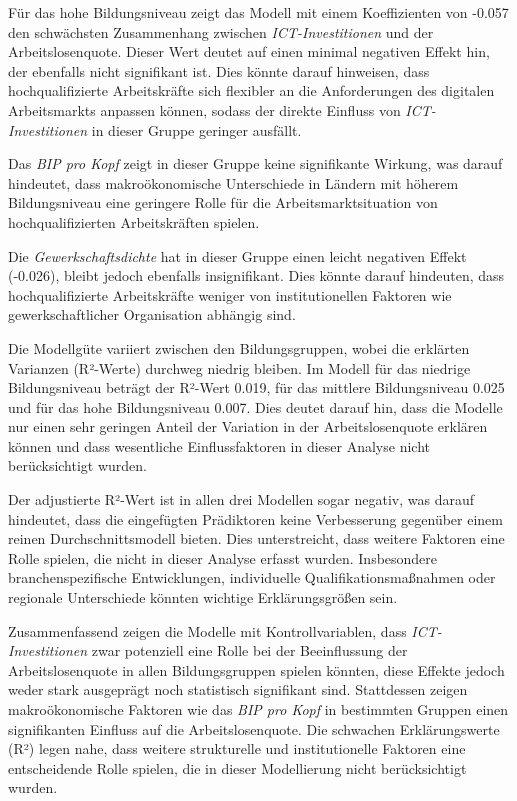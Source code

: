 Für das hohe Bildungsniveau zeigt das Modell mit einem Koeffizienten von -0.057 den 
schwächsten Zusammenhang zwischen \textit{\ac{ICT}-Investitionen} und der Arbeitslosenquote. 
Dieser Wert deutet auf einen minimal negativen Effekt hin, der ebenfalls nicht signifikant 
ist. Dies könnte darauf hinweisen, dass hochqualifizierte Arbeitskräfte sich flexibler an 
die Anforderungen des digitalen Arbeitsmarkts anpassen können, sodass der direkte Einfluss 
von \textit{\ac{ICT}-Investitionen} in dieser Gruppe geringer ausfällt.

Das \textit{\ac{BIP} pro Kopf} zeigt in dieser Gruppe keine signifikante Wirkung, was darauf 
hindeutet, dass makroökonomische Unterschiede in Ländern mit höherem Bildungsniveau eine 
geringere Rolle für die Arbeitsmarktsituation von hochqualifizierten Arbeitskräften spielen.

Die \textit{Gewerkschaftsdichte} hat in dieser Gruppe einen leicht negativen Effekt (-0.026), 
bleibt jedoch ebenfalls insignifikant. Dies könnte darauf hindeuten, dass hochqualifizierte 
Arbeitskräfte weniger von institutionellen Faktoren wie gewerkschaftlicher Organisation 
abhängig sind.

Die Modellgüte variiert zwischen den Bildungsgruppen, wobei die erklärten Varianzen (R²-Werte) 
durchweg niedrig bleiben. Im Modell für das niedrige Bildungsniveau beträgt der R²-Wert 0.019, 
für das mittlere Bildungsniveau 0.025 und für das hohe Bildungsniveau 0.007. Dies deutet darauf 
hin, dass die Modelle nur einen sehr geringen Anteil der Variation in der Arbeitslosenquote 
erklären können und dass wesentliche Einflussfaktoren in dieser Analyse nicht berücksichtigt 
wurden.

Der adjustierte R²-Wert ist in allen drei Modellen sogar negativ, was darauf hindeutet, dass 
die eingefügten Prädiktoren keine Verbesserung gegenüber einem reinen Durchschnittsmodell bieten. 
Dies unterstreicht, dass weitere Faktoren eine Rolle spielen, die nicht in dieser Analyse 
erfasst wurden. Insbesondere branchenspezifische Entwicklungen, individuelle 
Qualifikationsmaßnahmen oder regionale Unterschiede könnten wichtige Erklärungsgrößen sein.

Zusammenfassend zeigen die Modelle mit Kontrollvariablen, dass \textit{\ac{ICT}-Investitionen} 
zwar potenziell eine Rolle bei der Beeinflussung der Arbeitslosenquote in allen 
Bildungsgruppen spielen könnten, diese Effekte jedoch weder stark ausgeprägt noch statistisch 
signifikant sind. Stattdessen zeigen makroökonomische Faktoren wie das \textit{\ac{BIP} pro Kopf} 
in bestimmten Gruppen einen signifikanten Einfluss auf die Arbeitslosenquote. Die schwachen 
Erklärungswerte (R²) legen nahe, dass weitere strukturelle und institutionelle Faktoren eine 
entscheidende Rolle spielen, die in dieser Modellierung nicht berücksichtigt wurden.

